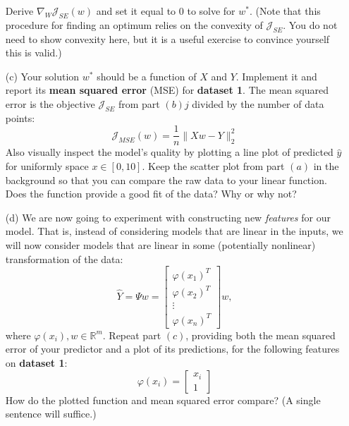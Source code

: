 \documentclass{article}
\begin{document}
\begin{itemize}
            Derive $\nabla_{W} \mathcal{J}_{SE}(w)$ and set it equal to $0$ to solve for $w^{*}$. (Note that this procedure for finding an optimum relies on the convexity of $\mathcal{J}_{SE}$. You do not need to show convexity here, but it is a useful exercise to convince yourself this is valid.)

            \item [(c)] Your solution $w^{*}$ should be a function of $X$ and $Y$. Implement it and report its \textbf{mean squared error} (MSE) for \textbf{dataset 1}. The mean squared error is the objective $\mathcal{J}_{SE}$ from part $(b)j$ divided by the number of data points:
                \begin{equation*}
                    \mathcal{J}_{MSE}(w) = \dfrac{1}{n}\lVert Xw - Y \rVert^{2}_{2}
                \end{equation*}
            Also visually inspect the model's quality by plotting a line plot of predicted $\hat{y}$ for uniformly space $x \in [0, 10]$. Keep the scatter plot from part $(a)$ in the background so that you can compare the raw data to your linear function. Does the function provide a good fit of the data? Why or why not?

            \item [(d)] We are now going to experiment with constructing new \textit{features} for our model. That is, instead of considering models that are linear in the inputs, we will now consider models that are linear in some (potentially nonlinear) transformation of the data:
                \begin{equation*}
                    \hat{Y} = \Psi w = \begin{bmatrix}
                        \varphi(x_{1})^{T} \\
                        \varphi(x_{2})^{T} \\
                        \vdots             \\
                        \varphi(x_{n})^{T}   
                    \end{bmatrix} w,
                \end{equation*}
            where $\varphi(x_{i}), w \in \mathbb{R}^{m}$. Repeat part $(c)$, providing both the mean squared error of your predictor and a plot of its predictions, for the following features on \textbf{dataset 1}:
                \begin{equation*}
                    \varphi(x_{i}) = \begin{bmatrix}
                        x_{i} \\
                        1       
                    \end{bmatrix}
                \end{equation*}
            How do the plotted function and mean squared error compare? (A single sentence will suffice.)


\end{itemize}
\end{document}
